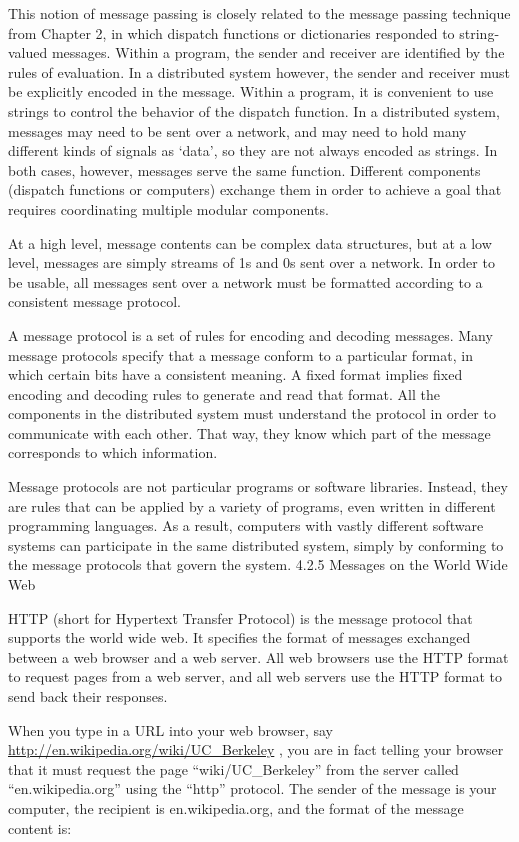 \documentclass[letterpaper,10pt,dvipdfmx]{sphinxmanual}
\begin{document}
This notion of message passing is closely related to the message passing technique from Chapter 2, in which dispatch functions or dictionaries responded to string-valued messages. Within a program, the sender and receiver are identified by the rules of evaluation. In a distributed system however, the sender and receiver must be explicitly encoded in the message. Within a program, it is convenient to use strings to control the behavior of the dispatch function. In a distributed system, messages may need to be sent over a network, and may need to hold many different kinds of signals as `data', so they are not always encoded as strings. In both cases, however, messages serve the same function. Different components (dispatch functions or computers) exchange them in order to achieve a goal that requires coordinating multiple modular components.

At a high level, message contents can be complex data structures, but at a low level, messages are simply streams of 1s and 0s sent over a network. In order to be usable, all messages sent over a network must be formatted according to a consistent message protocol.

A message protocol is a set of rules for encoding and decoding messages. Many message protocols specify that a message conform to a particular format, in which certain bits have a consistent meaning. A fixed format implies fixed encoding and decoding rules to generate and read that format. All the components in the distributed system must understand the protocol in order to communicate with each other. That way, they know which part of the message corresponds to which information.

Message protocols are not particular programs or software libraries. Instead, they are rules that can be applied by a variety of programs, even written in different programming languages. As a result, computers with vastly different software systems can participate in the same distributed system, simply by conforming to the message protocols that govern the system.
4.2.5   Messages on the World Wide Web

HTTP (short for Hypertext Transfer Protocol) is the message protocol that supports the world wide web. It specifies the format of messages exchanged between a web browser and a web server. All web browsers use the HTTP format to request pages from a web server, and all web servers use the HTTP format to send back their responses.

When you type in a URL into your web browser, say \href{http://en.wikipedia.org/wiki/UC\_Berkeley}{http://en.wikipedia.org/wiki/UC\_Berkeley} , you are in fact telling your browser that it must request the page ``wiki/UC\_Berkeley'' from the server called ``en.wikipedia.org'' using the ``http'' protocol. The sender of the message is your computer, the recipient is en.wikipedia.org, and the format of the message content is:
\end{document}
